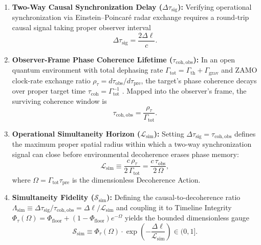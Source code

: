 \documentclass[11pt,a4paper]{article}
\begin{document}
\begin{enumerate}
    \item \textbf{Two-Way Causal Synchronization Delay ($\Delta \tau_{\mathrm{sig}}$):} Verifying operational synchronization via Einstein--Poincaré radar exchange requires a round-trip causal signal taking proper observer interval
    \begin{equation}
        \Delta \tau_{\mathrm{sig}} = \frac{2 \Delta \ell}{c}.
    \end{equation}

    \item \textbf{Observer-Frame Phase Coherence Lifetime ($\tau_{\mathrm{coh,obs}}$):} In an open quantum environment with total dephasing rate $\Gamma_{\mathrm{tot}} = \Gamma_{\mathrm{th}} + \Gamma_{\mathrm{grav}}$ and ZAMO clock-rate exchange ratio $\rho_\tau = d\tau_{\mathrm{obs}} / d\tau_{\mathrm{pre}}$, the target's phase coherence decays over proper target time $\tau_{\mathrm{coh}} = \Gamma_{\mathrm{tot}}^{-1}$ \cite{lindblad1976,diosi1989,penrose1996}. Mapped into the observer's frame, the surviving coherence window is
    \begin{equation}
        \tau_{\mathrm{coh,obs}} = \frac{\rho_\tau}{\Gamma_{\mathrm{tot}}}.
    \end{equation}

    \item \textbf{Operational Simultaneity Horizon ($\mathcal{L}_{\mathrm{sim}}$):} Setting $\Delta \tau_{\mathrm{sig}} = \tau_{\mathrm{coh,obs}}$ defines the maximum proper spatial radius within which a two-way synchronization signal can close before environmental decoherence erases phase memory:
    \begin{equation}
        \mathcal{L}_{\mathrm{sim}} \equiv \frac{c \, \rho_\tau}{2 \, \Gamma_{\mathrm{tot}}} = \frac{c \, \tau_{\mathrm{obs}}}{2 \, \Omega},
    \end{equation}
    where $\Omega = \Gamma_{\mathrm{tot}} \tau_{\mathrm{pre}}$ is the dimensionless Decoherence Action.

    \item \textbf{Simultaneity Fidelity ($\mathcal{S}_{\mathrm{sim}}$):} Defining the causal-to-decoherence ratio $\Lambda_{\mathrm{sim}} \equiv \Delta \tau_{\mathrm{sig}} / \tau_{\mathrm{coh,obs}} = \Delta \ell / \mathcal{L}_{\mathrm{sim}}$ and coupling it to Timeline Integrity $\Phi_\tau(\Omega) = \Phi_{\mathrm{floor}} + (1 - \Phi_{\mathrm{floor}})e^{-\Omega}$ yields the bounded dimensionless gauge
    \begin{equation}
        \mathcal{S}_{\mathrm{sim}} \equiv \Phi_\tau(\Omega) \cdot \exp\!\left(-\frac{\Delta \ell}{\mathcal{L}_{\mathrm{sim}}}\right) \in (0, 1].
    \end{equation}
\end{enumerate}
\end{document}
